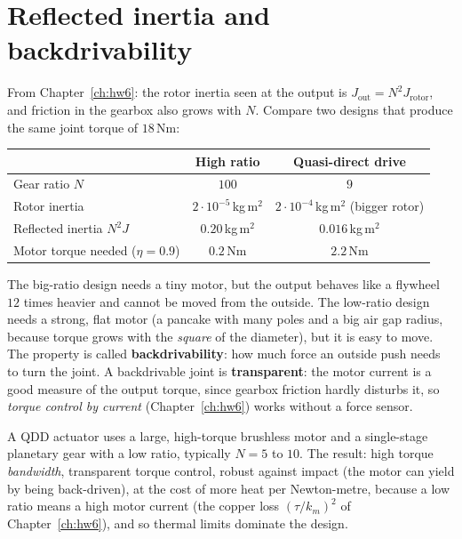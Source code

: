 \section*{Reflected inertia and backdrivability}
From Chapter~\ref{ch:hw6}: the rotor inertia seen at the output is $J_\text{out}=N^2J_\text{rotor}$, and friction in the gearbox also grows with $N$. Compare two designs that produce the same joint torque of $18$\,Nm:
\begin{center}
\renewcommand{\arraystretch}{1.25}
\begin{tabular}{lcc}
 & \textbf{High ratio} & \textbf{Quasi-direct drive}\\ \hline
Gear ratio $N$ & $100$ & $9$\\
Rotor inertia & $2\cdot10^{-5}$\,kg\,m$^2$ & $2\cdot10^{-4}$\,kg\,m$^2$ (bigger rotor)\\
Reflected inertia $N^2J$ & $0.20$\,kg\,m$^2$ & $0.016$\,kg\,m$^2$\\
Motor torque needed ($\eta=0.9$) & $0.2$\,Nm & $2.2$\,Nm\\
\end{tabular}
\end{center}
The big-ratio design needs a tiny motor, but the output behaves like a flywheel $12$ times heavier and cannot be moved from the outside. The low-ratio design needs a strong, flat motor (a pancake with many poles and a big air gap radius, because torque grows with the \emph{square} of the diameter), but it is easy to move. The property is called \textbf{backdrivability}: how much force an outside push needs to turn the joint. A backdrivable joint is \textbf{transparent}: the motor current is a good measure of the output torque, since gearbox friction hardly disturbs it, so \emph{torque control by current} (Chapter~\ref{ch:hw6}) works without a force sensor.

\begin{keyidea}
A QDD actuator uses a large, high-torque brushless motor and a single-stage planetary gear with a low ratio, typically $N=5$ to $10$. The result: high torque \emph{bandwidth}, transparent torque control, robust against impact (the motor can yield by being back-driven), at the cost of more heat per Newton-metre, because a low ratio means a high motor current (the copper loss $(\tau/k_m)^2$ of Chapter~\ref{ch:hw6}), and so thermal limits dominate the design.
\end{keyidea}

